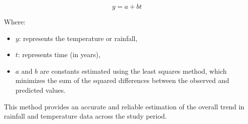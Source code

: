 \begin{equation}
  y = a + bt \tag{4}
\label{eq:linear_regression}
\end{equation}

Where:
\begin{itemize}
  \item \( y \): represents the temperature or rainfall,
  \item \( t \): represents time (in years),
  \item \( a \) and \( b \) are constants estimated using the least squares method, which minimizes the sum of the squared differences between the observed and predicted values.
\end{itemize}

This method provides an accurate and reliable estimation of the overall trend in rainfall and temperature data across the study period.


